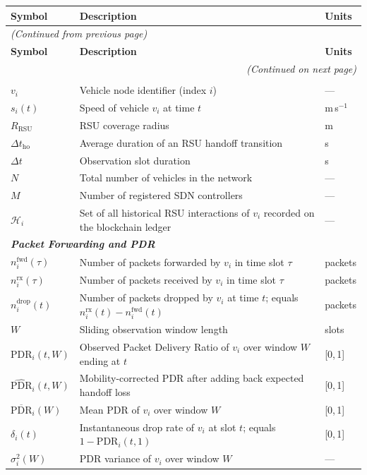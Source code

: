 \documentclass[12pt, a4paper]{report}
\begin{document}
\begin{longtable}{p{2.6cm} p{9.2cm} p{1.9cm}}
\hline
\textbf{Symbol} & \textbf{Description} & \textbf{Units} \\
\hline
\endfirsthead
\multicolumn{3}{l}{\textit{(Continued from previous page)}} \\[2pt]
\hline
\textbf{Symbol} & \textbf{Description} & \textbf{Units} \\
\hline
\endhead
\hline
\multicolumn{3}{r}{\textit{(Continued on next page)}} \\
\endfoot
\hline
\endlastfoot

\multicolumn{3}{l}{\textit{\textbf{Vehicular Network}}} \\[2pt]
$v_i$ & Vehicle node identifier (index $i$) & --- \\
$s_i(t)$ & Speed of vehicle $v_i$ at time $t$ & m\,s$^{-1}$ \\
$R_\mathrm{RSU}$ & RSU coverage radius & m \\
$\Delta t_\mathrm{ho}$ & Average duration of an RSU handoff transition & s \\
$\Delta t$ & Observation slot duration & s \\
$N$ & Total number of vehicles in the network & --- \\
$M$ & Number of registered SDN controllers & --- \\
$\mathcal{H}_i$ & Set of all historical RSU interactions of $v_i$ recorded on the blockchain ledger & --- \\[6pt]

\multicolumn{3}{l}{\textit{\textbf{Packet Forwarding and PDR}}} \\[2pt]
$n_i^{\text{fwd}}(\tau)$ & Number of packets forwarded by $v_i$ in time slot $\tau$ & packets \\
$n_i^{\text{rx}}(\tau)$ & Number of packets received by $v_i$ in time slot $\tau$ & packets \\
$n_i^{\text{drop}}(t)$ & Number of packets dropped by $v_i$ at time $t$; equals $n_i^{\text{rx}}(t) - n_i^{\text{fwd}}(t)$ & packets \\
$W$ & Sliding observation window length & slots \\
$\mathrm{PDR}_i(t,W)$ & Observed Packet Delivery Ratio of $v_i$ over window $W$ ending at $t$ & [0,\,1] \\
$\widehat{\mathrm{PDR}}_i(t,W)$ & Mobility-corrected PDR after adding back expected handoff loss & [0,\,1] \\
$\overline{\mathrm{PDR}}_i(W)$ & Mean PDR of $v_i$ over window $W$ & [0,\,1] \\
$\delta_i(t)$ & Instantaneous drop rate of $v_i$ at slot $t$; equals $1 - \mathrm{PDR}_i(t,1)$ & [0,\,1] \\
$\sigma^2_i(W)$ & PDR variance of $v_i$ over window $W$ & --- \\[6pt]


\end{longtable}
\end{document}
